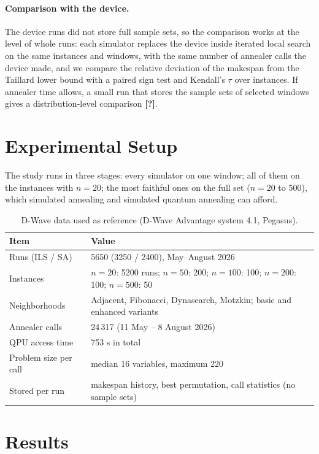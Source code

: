 \documentclass[11pt]{article}
\newcommand{\tofill}[1]{\textbf{[#1]}}
\begin{document}
\paragraph{Comparison with the device.}
The device runs did not store full sample sets, so the comparison works at the
level of whole runs: each simulator replaces the device inside iterated local
search on the same instances and windows, with the same number of annealer
calls the device made, and we compare the relative deviation of the makespan
from the Taillard lower bound with a paired sign test and Kendall's $\tau$
over instances. If annealer time allows, a small run that stores the sample
sets of selected windows gives a distribution-level comparison \tofill{?}.

\section{Experimental Setup}

The study runs in three stages: every simulator on one window; all of them on
the instances with $n = 20$; the most faithful ones on the full set
($n = 20$ to $500$), which simulated annealing and simulated quantum annealing
can afford.

\begin{table}[t]
\caption{D-Wave data used as reference (D-Wave Advantage system 4.1, Pegasus).}
\label{tab:hw}
\centering
\small
\begin{tabular}{ll}
\toprule
Item & Value \\
\midrule
Runs (ILS / SA) & 5650 (3250 / 2400), May--August 2026 \\
Instances & $n = 20$: 5200 runs; $n = 50$: 200; $n = 100$: 100; $n = 200$: 100; $n = 500$: 50 \\
Neighborhoods & Adjacent, Fibonacci, Dynasearch, Motzkin; basic and enhanced variants~\cite{wojewodzki2026windowed} \\
Annealer calls & 24\,317 (11 May -- 8 August 2026) \\
QPU access time & 753 s in total \\
Problem size per call & median 16 variables, maximum 220 \\
Stored per run & makespan history, best permutation, call statistics (no sample sets) \\
\bottomrule
\end{tabular}
\end{table}

\section{Results}
\end{document}
